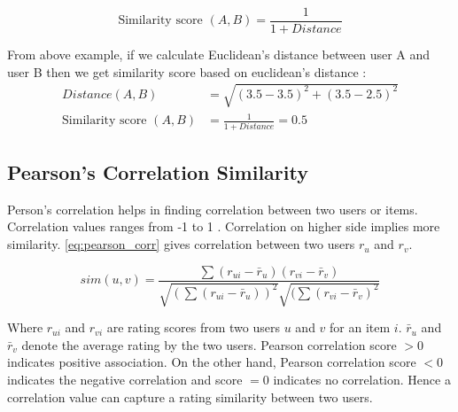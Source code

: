 \begin{equation}
\textrm{Similarity score }(A,B) = \frac{1}{1+ Distance}
\label{euclidean_simscore}
\end{equation}

\noindent From above example, if we calculate Euclidean's distance between user A and user B then we get similarity score based on euclidean's distance :
\begin{align*}
Distance (A, B) &= \sqrt{(3.5 - 3.5)^{2} + (3.5 - 2.5)^{2}} \\
\textrm{Similarity score }(A,B) &= \frac{1}{1+ Distance} = 0.5
\end{align*}


\subsection{Pearson's Correlation Similarity}
\label{pearson_correlation}
Person's correlation helps in finding correlation between two users or items. Correlation values ranges from -1 to 1 \cite{20}. Correlation on higher side implies more similarity. \autoref{eq:pearson_corr} gives correlation between two users $r_{u}$ and $r_{v}$.

\begin{equation}
sim(u,v) = \frac{\sum (r_{ui} - \bar{r}_u) (r_{vi} - \bar{r}_v )}{\sqrt{(\sum (r_{ui} - \bar{r}_u))^2} \sqrt{(\sum (r_{vi} - \bar{r}_v )^2}}
\label{eq:pearson_corr}
\end{equation}

\noindent Where $r_{ui}$ and $r_{vi}$ are rating scores from two users $u$ and $v$ for an item $i$. $\bar{r}_{u}$ and $\bar{r}_{v}$ denote the average rating by the two users.
Pearson correlation score $> 0$ indicates positive association. On the other hand, Pearson correlation score $ < 0$ indicates the negative correlation and score $ = 0$ indicates no correlation. Hence a correlation value can capture a rating similarity between two users.
